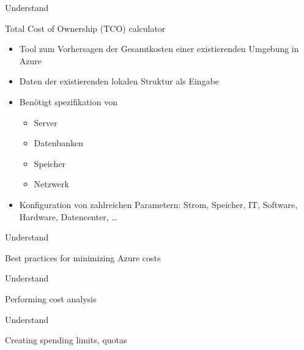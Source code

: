 \documentclass{scrartcl}
\newenvironment{flashcard}[2][]{%
    #1
    \vfill
    \centerline{\Large{#2}}
    \vfill
\newpage
}
{\newpage}
\begin{document}
    \begin{flashcard}[Understand]{Total Cost of Ownership (TCO) calculator}
        \begin{itemize}
            \item Tool zum Vorhersagen der Gesamtkosten einer existierenden Umgebung in Azure
            \item Daten der existierenden lokalen Struktur als Eingabe
            \item Benötigt spezifikation von
            \begin{itemize}
                \item Server
                \item Datenbanken
                \item Speicher
                \item Netzwerk
            \end{itemize}
            \item Konfiguration von zahlreichen Parametern:\newline
            Strom, Speicher, IT, Software, Hardware, Datencenter, \ldots
        \end{itemize}

    \end{flashcard}

    \begin{flashcard}[Understand]{Best practices for minimizing Azure costs}

    \end{flashcard}

    \begin{flashcard}[Understand]{Performing cost analysis}

    \end{flashcard}

    \begin{flashcard}[Understand]{Creating spending limits, quotas}

    \end{flashcard}
\end{document}
